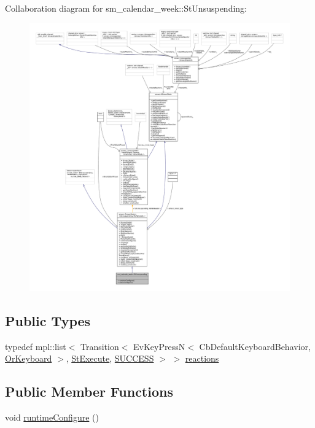 Collaboration diagram for sm\+\_\+calendar\+\_\+week\+:\+:St\+Unsuspending\+:
\nopagebreak
\begin{figure}[H]
\begin{center}
\leavevmode
\includegraphics[width=350pt]{structsm__calendar__week_1_1StUnsuspending__coll__graph}
\end{center}
\end{figure}
\subsection*{Public Types}
\begin{DoxyCompactItemize}
\item 
typedef mpl\+::list$<$ Transition$<$ Ev\+Key\+PressN$<$ Cb\+Default\+Keyboard\+Behavior, \hyperlink{classsm__calendar__week_1_1OrKeyboard}{Or\+Keyboard} $>$, \hyperlink{structsm__calendar__week_1_1StExecute}{St\+Execute}, \hyperlink{classSUCCESS}{S\+U\+C\+C\+E\+SS} $>$ $>$ \hyperlink{structsm__calendar__week_1_1StUnsuspending_ae1e74bc7e78c1d1b0d1f0caa5380e974}{reactions}
\end{DoxyCompactItemize}
\subsection*{Public Member Functions}
\begin{DoxyCompactItemize}
\item 
void \hyperlink{structsm__calendar__week_1_1StUnsuspending_ad8e123dbc9110a6515d3375500071733}{runtime\+Configure} ()
\end{DoxyCompactItemize}
